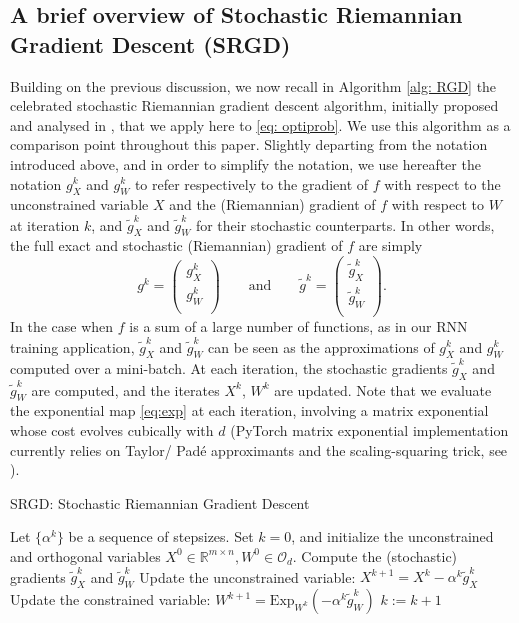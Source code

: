 \documentclass{article}
\def \R {\mathbb{R}}
\begin{document}
\subsection{A brief overview of Stochastic Riemannian Gradient Descent (SRGD)}
Building on the previous discussion, we now recall in Algorithm \ref{alg: RGD} the celebrated stochastic Riemannian gradient descent algorithm, initially proposed and analysed in \cite{Bonnabel2013}, that we apply here to \eqref{eq: optiprob}. We use this algorithm as a comparison point throughout this paper. Slightly departing from the notation introduced above, and in order to simplify the notation, we use hereafter the notation $g_X^k$ and $g_W^k$ to refer respectively to the gradient of $f$ with respect to the unconstrained variable $X$ and the (Riemannian) gradient of $f$ with respect to $W$ at iteration $k$, and $\tilde g_X^k$ and $\tilde g_W^k$ for their stochastic counterparts. In other words, the full exact and stochastic (Riemannian) gradient of $f$ are simply
\[  g^k = \begin{pmatrix}
g_X^k \\
g_W^k \\
\end{pmatrix} \qquad \text{and} \qquad \tilde{g}^k = \begin{pmatrix}
\tilde{g}_X^k \\
\tilde{g}_W^k \\
\end{pmatrix}.\]
In the case when $f$ is a sum of a large number of functions, as in our RNN training application, $\tilde{g}_{X}^k$ and $\tilde{g}_{W}^k$ can be seen as the approximations of $g_X^k$ and $g_W^k$ computed over a mini-batch. At each iteration, the stochastic gradients $\tilde{g}_X^k$ and $\tilde{g}_W^k$ are computed, and the iterates $X^k$, $W^k$ are updated. Note that we evaluate the exponential map \eqref{eq:exp} at each iteration, involving a matrix exponential whose cost evolves cubically with $d$ (PyTorch matrix exponential implementation currently relies on Taylor/ Pad\'e approximants and the scaling-squaring trick, see \cite{Bader2019}). 

\begin{algorithm}[t]
	\caption{SRGD: Stochastic Riemannian Gradient Descent}
	\label{alg: RGD}
	\begin{algorithmic}[1]
		\State Let $\{\alpha^k\}$ be a sequence of stepsizes. Set $k = 0$, and initialize the unconstrained and orthogonal variables $X^0 \in \R^{m \times n}, W^0 \in \mathcal{O}_{d}$. 
		\State Compute the (stochastic) gradients $\tilde{g}_X^k$ and $\tilde{g}_W^k$
		\State Update the unconstrained variable: $X^{k+1} = X^k - \alpha^k \tilde{g}_X^k$
		\State Update the constrained variable: $W^{k+1} =  \mathrm{Exp}_{W^k} (-\alpha^k \tilde{g}_{W}^k)$
		\State $k := k+1$
		\EndWhile
	\end{algorithmic}
\end{algorithm}
\end{document}
